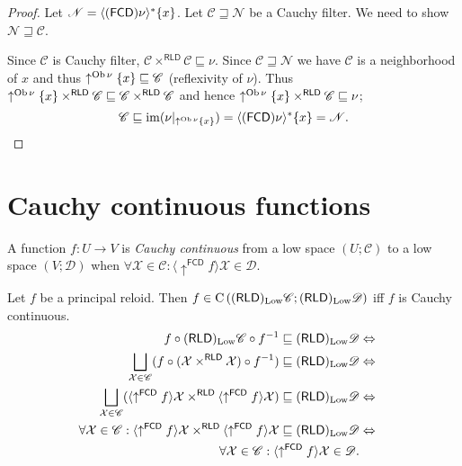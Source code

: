 \begin{proof}
  Let $\mathscr{N} = \langle (\mathsf{FCD}) \nu \rangle^{\ast} \{ x
  \}$. Let $\mathscr{C \sqsupseteq N}$ be a Cauchy filter. We need to show
  $\mathscr{N \sqsupseteq C}$.
  
  Since $\mathscr{C}$ is Cauchy filter, $\mathscr{C}
  \times^{\mathsf{RLD}} \mathscr{C} \sqsubseteq \nu$. Since $\mathscr{C
  \sqsupseteq N}$ we have $\mathscr{C}$ is a neighborhood of $x$ and thus
  $\uparrow^{\operatorname{Ob} \nu} \{ x \} \sqsubseteq \mathscr{C}$ (reflexivity of
  $\nu$). Thus $\uparrow^{\operatorname{Ob} \nu} \{ x \} \times^{\mathsf{RLD}}
  \mathscr{C} \sqsubseteq \mathscr{C} \times^{\mathsf{RLD}}
  \mathscr{C}$ and hence $\uparrow^{\operatorname{Ob} \nu} \{ x \}
  \times^{\mathsf{RLD}} \mathscr{C} \sqsubseteq \nu$;
  \[ \mathscr{C} \sqsubseteq \operatorname{im} (\nu |_{\uparrow^{\operatorname{Ob} \nu} \{ x
     \}}) = \langle (\mathsf{FCD}) \nu \rangle^{\ast} \{ x \} =
     \mathscr{N} . \]
\end{proof}

\section{Cauchy continuous functions}

\begin{defn}
  A function $f : U \rightarrow V$ is \emph{Cauchy continuous} from a low
  space $\left( U ; \mathscr{C} \right)$ to a low space
  $\left( V ; \mathscr{D} \right)$ when $\forall \mathcal{X} \in \mathscr{C} :
  \langle \uparrow^{\mathsf{FCD}} f \rangle \mathcal{X} \in
  \mathscr{D}$.
\end{defn}

\begin{prop}
  Let $f$ be a principal reloid. Then $f \in \mathrm{C} \left( 
  (\mathsf{RLD})_{\operatorname{Low}} \mathscr{C} ;
  (\mathsf{RLD})_{\operatorname{Low}} \mathscr{D} \right)$ iff $f$ is Cauchy
  continuous.
  \begin{eqnarray*}
    f \circ (\mathsf{RLD})_{\Low} \mathscr{C} \circ f^{- 1}
    \sqsubseteq (\mathsf{RLD})_{\Low} \mathscr{D} &
    \Leftrightarrow & \\
    \bigsqcup_{\mathcal{X} \in
    \mathscr{C}} (f \circ (\mathcal{X} \times^{\mathsf{RLD}}
    \mathcal{X} ) \circ f^{- 1} ) \sqsubseteq (\mathsf{RLD})_{\Low}
    \mathscr{D} & \Leftrightarrow & \\
    \bigsqcup_{\mathcal{X} \in \mathscr{C}} ( \langle \uparrow^{\mathsf{FCD}} f \rangle
    \mathcal{X} \times^{\mathsf{RLD}} \langle
    \uparrow^{\mathsf{FCD}} f \rangle \mathcal{X}) \sqsubseteq
    (\mathsf{RLD})_{\Low} \mathscr{D} & \Leftrightarrow & \\
    \forall \mathcal{X} \in \mathscr{C} : \langle
    \uparrow^{\mathsf{FCD}} f \rangle \mathcal{X}
    \times^{\mathsf{RLD}} \langle \uparrow^{\mathsf{FCD}} f
    \rangle \mathcal{X} \sqsubseteq (\mathsf{RLD})_{\Low}
    \mathscr{D} & \Leftrightarrow & \\
    \forall \mathcal{X} \in \mathscr{C} : \langle
    \uparrow^{\mathsf{FCD}} f \rangle \mathcal{X} \in \mathscr{D} . & 
    & 
  \end{eqnarray*}
\end{prop}

